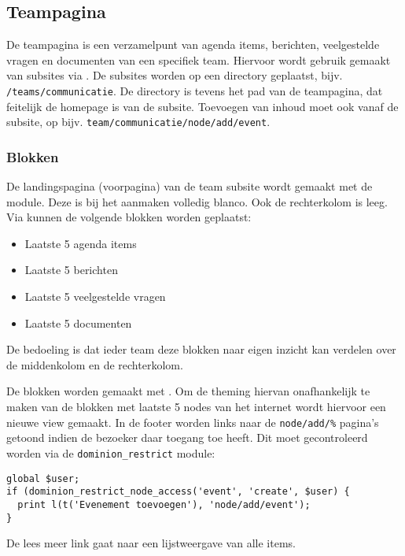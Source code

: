 \subsection{Teampagina}\label{teampagina}

De teampagina is een verzamelpunt van agenda items, berichten, veelgestelde vragen en documenten van een specifiek team. Hiervoor wordt gebruik gemaakt van subsites via . De subsites worden op een directory geplaatst, bijv. \texttt{/teams/communicatie}. De directory is tevens het pad van de teampagina, dat feitelijk de homepage is van de subsite. Toevoegen van inhoud moet ook vanaf de subsite, op bijv. \texttt{team/communicatie/node/add/event}.

\subsubsection{Blokken}

De landingspagina (voorpagina) van de team subsite wordt gemaakt met de  module. Deze is bij het aanmaken volledig blanco. Ook de rechterkolom is leeg. Via  kunnen de volgende blokken worden geplaatst:
\begin{itemize}
\item Laatste 5 agenda items
\item Laatste 5 berichten
\item Laatste 5 veelgestelde vragen
\item Laatste 5 documenten
\end{itemize}
De bedoeling is dat ieder team deze blokken naar eigen inzicht kan verdelen over de middenkolom en de rechterkolom.

De blokken worden gemaakt met . Om de theming hiervan onafhankelijk te maken van de blokken met laatste 5 nodes van het internet wordt hiervoor een nieuwe view gemaakt. In de footer worden links naar de \texttt{node/add/\%} pagina's getoond indien de bezoeker daar toegang toe heeft. Dit moet gecontroleerd worden via de \texttt{dominion\_restrict} module:

\begin{verbatim}
global $user;
if (dominion_restrict_node_access('event', 'create', $user) {
  print l(t('Evenement toevoegen'), 'node/add/event');
}
\end{verbatim}

De lees meer link gaat naar een lijstweergave van alle items.

